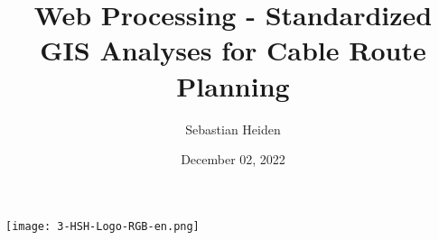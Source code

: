 \documentclass[usenames,dvipsnames,aspectratio=169]{beamer}
\title{Web Processing - Standardized GIS Analyses for Cable Route Planning}
\author{Sebastian Heiden}
\institute{Harz University of Applied Sciences}
\date{December 02, 2022}
\begin{document}
    

\begin{frame}[plain]
	\texttt{[image: 3-HSH-Logo-RGB-en.png]}
    \maketitle
\end{frame}

	
\end{document}
